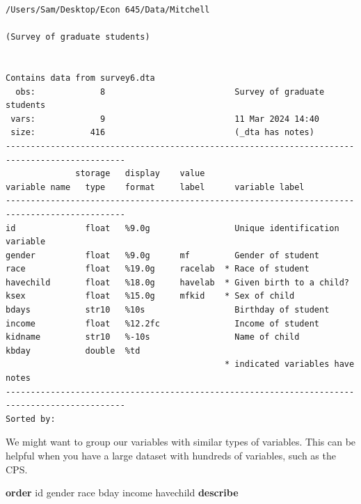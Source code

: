 \documentclass[
]{book}
\newenvironment{Shaded}{\begin{snugshade}}{\end{snugshade}}
\newcommand{\KeywordTok}[1]{\textcolor[rgb]{0.13,0.29,0.53}{\textbf{#1}}}
\newcommand{\NormalTok}[1]{#1}
\begin{document}
\begin{verbatim}
/Users/Sam/Desktop/Econ 645/Data/Mitchell

(Survey of graduate students)


Contains data from survey6.dta
  obs:             8                          Survey of graduate students
 vars:             9                          11 Mar 2024 14:40
 size:           416                          (_dta has notes)
----------------------------------------------------------------------------------------------
              storage   display    value
variable name   type    format     label      variable label
----------------------------------------------------------------------------------------------
id              float   %9.0g                 Unique identification variable
gender          float   %9.0g      mf         Gender of student
race            float   %19.0g     racelab  * Race of student
havechild       float   %18.0g     havelab  * Given birth to a child?
ksex            float   %15.0g     mfkid    * Sex of child
bdays           str10   %10s                  Birthday of student
income          float   %12.2fc               Income of student
kidname         str10   %-10s                 Name of child
kbday           double  %td                   
                                            * indicated variables have notes
----------------------------------------------------------------------------------------------
Sorted by: 
\end{verbatim}

We might want to group our variables with similar types of variables. This can be helpful when you have a large dataset with hundreds of variables, such as the CPS.

\begin{Shaded}
\begin{Highlighting}[]
\KeywordTok{order}\NormalTok{ id gender race bday income havechild}
\KeywordTok{describe}
\end{Highlighting}
\end{Shaded}
\end{document}
